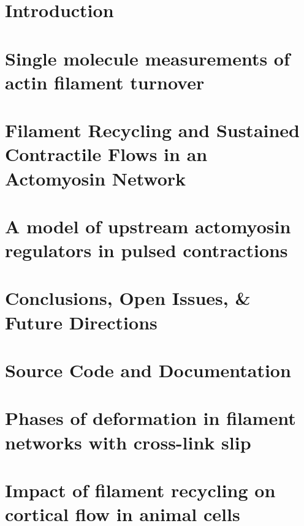 \documentclass{easychithesis}
\begin{document}
%
%

\tableofcontents

%
% 

\listoffigures

% 
% 

\listoftables

%
%
\mainmatter

%
%
\chapter{Introduction}


\chapter{Single molecule measurements of actin filament turnover}


\chapter{Filament Recycling and Sustained Contractile Flows in an Actomyosin Network}
\label{sec:core}



\chapter{A model of upstream actomyosin regulators in pulsed contractions}


\chapter{Conclusions, Open Issues, \& Future Directions}


\appendix

\chapter{Source Code and Documentation}



\chapter{Phases of deformation in filament networks with cross-link slip}


\chapter{Impact of filament recycling on cortical flow in animal cells}

\end{document}
